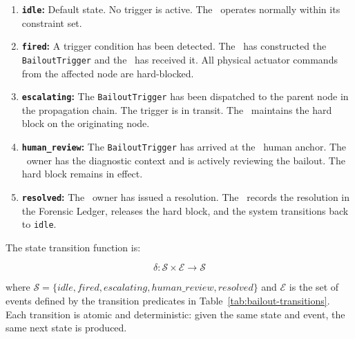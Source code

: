 \begin{enumerate}
\item \textbf{\texttt{idle}:} Default state. No trigger is active. The \bounds\ operates normally within its constraint set.
\item \textbf{\texttt{fired}:} A trigger condition has been detected. The \bounds\ has constructed the \texttt{BailoutTrigger} and the \fact\ has received it. All physical actuator commands from the affected node are hard-blocked.
\item \textbf{\texttt{escalating}:} The \texttt{BailoutTrigger} has been dispatched to the parent node in the propagation chain. The trigger is in transit. The \fact\ maintains the hard block on the originating node.
\item \textbf{\texttt{human\_review}:} The \texttt{BailoutTrigger} has arrived at the \purpose\ human anchor. The \purpose\ owner has the diagnostic context and is actively reviewing the bailout. The hard block remains in effect.
\item \textbf{\texttt{resolved}:} The \purpose\ owner has issued a resolution. The \fact\ records the resolution in the Forensic Ledger, releases the hard block, and the system transitions back to \texttt{idle}.
\end{enumerate}

The state transition function is:

\begin{equation}
\delta: \mathcal{S} \times \mathcal{E} \rightarrow \mathcal{S}
\end{equation}

where $\mathcal{S} = \{idle, fired, escalating, human\_review, resolved\}$ and $\mathcal{E}$ is the set of events defined by the transition predicates in Table~\ref{tab:bailout-transitions}. Each transition is atomic and deterministic: given the same state and event, the same next state is produced.

